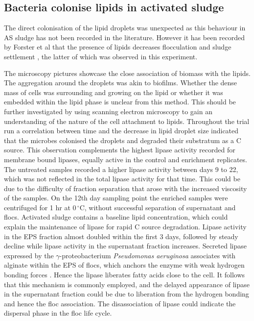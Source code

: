 \documentclass[11pt]{article}
\begin{document}
\subsection{Bacteria colonise lipids in activated sludge}
The direct colonisation of the lipid droplets was unexpected as this behaviour in AS sludge has not been recorded in the literature. However it has been recorded by Forster et al that the presence of lipids decreases flocculation and sludge settlement \cite{Forster_92}, the latter of which was observed in this experiment.

The microscopy pictures showcase the close association of biomass with the lipids. The aggregation around the droplets was akin to biofilms. Whether the dense mass of cells was surrounding and growing on the lipid or whether it was embedded within the lipid phase is unclear from this method. This should be further investigated by using scanning electron microscopy to gain an understanding of the nature of the cell attachment to lipids.
Throughout the trial run a correlation between time and the decrease in lipid droplet size indicated that the microbes colonised the droplets and degraded their substratum as a C source. This observation complements the highest lipase activity recorded for membrane bound lipases, equally active in the control and enrichment replicates. The untreated samples recorded a higher lipase activity between days 9 to 22, which was not reflected in the total lipase activity for that time. This could be due to the difficulty of fraction separation that arose with the increased viscosity of the samples. On the 12th day sampling point the enriched samples were centrifuged for 1 hr at $0\,^{\circ}\mathrm{C}$, without successful separation of supernatant and flocs. 
Activated sludge contains a baseline lipid concentration, which could explain the maintenance of lipase for rapid C source degradation. Lipase activity in the EPS fraction almost doubled within the first 3 days, followed by steady decline while lipase activity in the supernatant fraction increases. Secreted lipase expressed by the \emph{$\gamma$}-proteobacterium \textit{Pseudomonas aeruginosa} associates with alginate within the EPS of flocs, which anchors the enzyme with weak hydrogen bonding forces \cite{mayer1999role,wicker1987}. Hence the lipase  liberates fatty acids close to the cell. It follows that this mechanism is commonly employed, and the delayed appearance of lipase in the supernatant fraction could be due to liberation from the hydrogen bonding and hence the floc association. The disassociation of lipase could indicate the dispersal phase in the floc life cycle.
\end{document}
